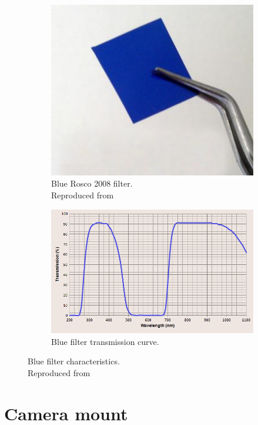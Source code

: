 \begin{figure}[H]
\begin{subfigure}{0.5\textwidth}
\centering
\includegraphics[scale=0.45]{images/blue_filter.jpg}
\caption{Blue Rosco 2008 filter.\\ Reproduced from \cite{blue_filter}}
\label{fig:blue_filter}
\end{subfigure}
\begin{subfigure}{0.5\textwidth}
\centering
\includegraphics[scale=0.42]{images/superblueinfraredfiltercurve.png}
\caption{Blue filter transmission curve.}
\label{fig:blue_curve}
\end{subfigure}
\caption{Blue filter characteristics.\\
Reproduced from \cite{blue_curve}}
\label{fig:blue_character}
\end{figure}

\section{Camera mount}

